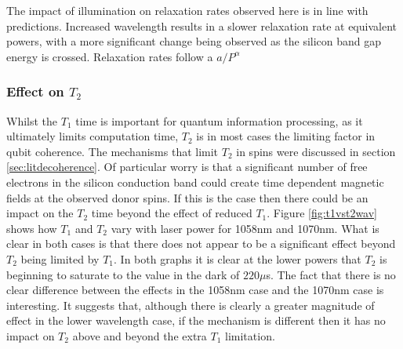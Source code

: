 The impact of illumination on relaxation rates observed here is in line with predictions.
Increased wavelength results in a slower relaxation rate at equivalent powers, with a more significant change being observed as the silicon band gap energy is crossed.
Relaxation rates follow a $a/P^{\alpha}$

\subsubsection{Effect on $T_2$}

Whilst the $T_1$ time is important for quantum information processing, as it ultimately limits computation time, $T_2$ is in most cases the limiting factor in qubit coherence.
The mechanisms that limit $T_2$ in spins were discussed in section \ref{sec:litdecoherence}.
Of particular worry is that a significant number of free electrons in the silicon conduction band could create time dependent magnetic fields at the observed donor spins. 
If this is the case then there could be an impact on the $T_2$ time beyond the effect of reduced $T_1$.
Figure \ref{fig:t1vst2wav} shows how $T_1$ and $T_2$ vary with laser power for 1058nm and 1070nm.
What is clear in both cases is that there does not appear to be a significant effect beyond $T_2$ being limited by $T_1$.
In both graphs it is clear at the lower powers that $T_2$ is beginning to saturate to the value in the dark of $220\mu$s.
The fact that there is no clear difference between the effects in the 1058nm case and the 1070nm case is interesting. 
It suggests that, although there is clearly a greater magnitude of effect in the lower wavelength case, if the mechanism is different then it has no impact on $T_2$ above and beyond the extra $T_1$ limitation.



